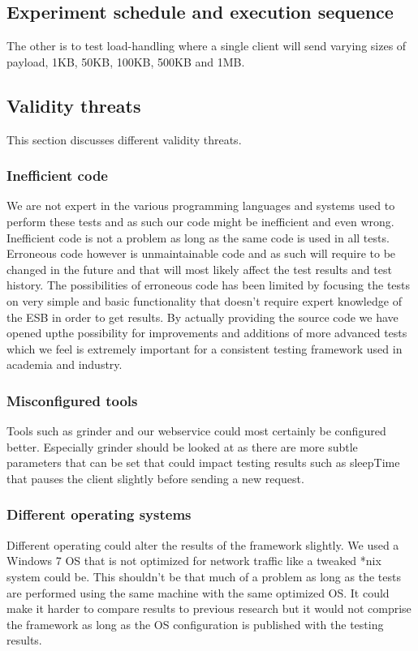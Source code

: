 \subsection{Experiment schedule and execution sequence}
The other is to test load-handling where a single client will send varying sizes of payload, 1KB, 50KB, 100KB, 500KB and 1MB.
\subsection{Validity threats}
This section discusses different validity threats.
\subsubsection{Inefficient code}
We are not expert in the various programming languages and systems used to perform these tests and as such our code might be inefficient and even wrong. Inefficient code is not a problem as long as the same code is used in all tests. Erroneous code however is unmaintainable code and as such will require to be changed in the future and that will most likely affect the test results and test history. 
The possibilities of erroneous code has been limited by focusing the tests on very simple and basic functionality that doesn't require expert knowledge of the ESB in order to get results.
By actually providing the source code we have opened upthe possibility for improvements and additions of more advanced tests which we feel is extremely important for a consistent testing framework used in academia and industry.

\subsubsection{Misconfigured tools}
Tools such as grinder and our webservice could most certainly be configured better. Especially grinder should be looked at as there are more subtle parameters that can be set that could impact testing results such as sleepTime that pauses the client slightly before sending a new request.

\subsubsection{Different operating systems}
Different operating could alter the results of the framework slightly. We used a Windows 7 OS that is not optimized for network traffic like a tweaked *nix system could be.
This shouldn't be that much of a problem as long as the tests are performed using the same machine with the same optimized OS. 
It could make it harder to compare results to previous research but it would not comprise the framework as long as the OS configuration is published with the testing results.


